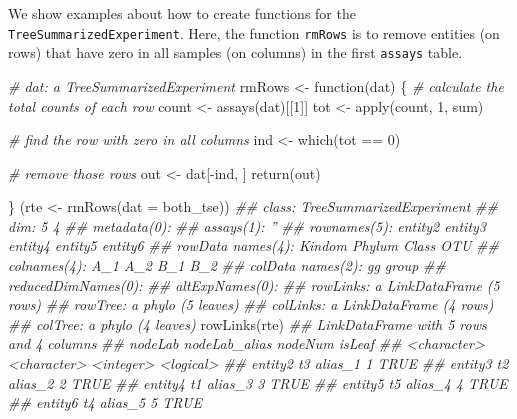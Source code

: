 \documentclass[]{article}
\newcommand{\hlnum}[1]{\textcolor[rgb]{0.816,0.125,0.439}{#1}}%
\newcommand{\hlstr}[1]{\textcolor[rgb]{0.251,0.627,0.251}{#1}}%
\newcommand{\hlcom}[1]{\textcolor[rgb]{0.502,0.502,0.502}{\textit{#1}}}%
\newcommand{\hlopt}[1]{\textcolor[rgb]{0,0,0}{#1}}%
\newcommand{\hlstd}[1]{\textcolor[rgb]{0.251,0.251,0.251}{#1}}%
\newcommand{\hlkwc}[1]{\textcolor[rgb]{0.251,0.251,0.251}{#1}}%
\newcommand{\hlkwd}[1]{\textcolor[rgb]{0.878,0.439,0.125}{#1}}%
\newenvironment{Shaded}{\begin{myshaded}}{\end{myshaded}}
\newcommand{\KeywordTok}[1]{\hlkwd{#1}}
\newcommand{\DataTypeTok}[1]{\hlkwc{#1}}
\newcommand{\DecValTok}[1]{\hlnum{#1}}
\newcommand{\StringTok}[1]{\hlstr{#1}}
\newcommand{\CommentTok}[1]{\hlcom{#1}}
\newcommand{\ControlFlowTok}[1]{\hlkwd{#1}}
\newcommand{\OperatorTok}[1]{\hlopt{#1}}
\newcommand{\NormalTok}[1]{\hlstd{#1}}
\begin{document}
We show examples about how to create functions for the
\texttt{TreeSummarizedExperiment}. Here, the function \texttt{rmRows} is to remove
entities (on rows) that have zero in all samples (on columns) in the first
\texttt{assays} table.

\begin{Shaded}
\begin{Highlighting}[]
\CommentTok{# dat: a TreeSummarizedExperiment}
\NormalTok{rmRows <-}\StringTok{ }\ControlFlowTok{function}\NormalTok{(dat) \{}
    \CommentTok{# calculate the total counts of each row}
\NormalTok{    count <-}\StringTok{ }\KeywordTok{assays}\NormalTok{(dat)[[}\DecValTok{1}\NormalTok{]]}
\NormalTok{    tot <-}\StringTok{ }\KeywordTok{apply}\NormalTok{(count, }\DecValTok{1}\NormalTok{, sum)}
    
    \CommentTok{# find the row with zero in all columns}
\NormalTok{    ind <-}\StringTok{ }\KeywordTok{which}\NormalTok{(tot }\OperatorTok{==}\StringTok{ }\DecValTok{0}\NormalTok{)}
    
    \CommentTok{# remove those rows}
\NormalTok{    out <-}\StringTok{ }\NormalTok{dat[}\OperatorTok{-}\NormalTok{ind, ]}
    \KeywordTok{return}\NormalTok{(out)}
    
\NormalTok{\}}
\NormalTok{(rte <-}\StringTok{ }\KeywordTok{rmRows}\NormalTok{(}\DataTypeTok{dat =}\NormalTok{ both_tse))}
\CommentTok{## class: TreeSummarizedExperiment }
\CommentTok{## dim: 5 4 }
\CommentTok{## metadata(0):}
\CommentTok{## assays(1): ''}
\CommentTok{## rownames(5): entity2 entity3 entity4 entity5 entity6}
\CommentTok{## rowData names(4): Kindom Phylum Class OTU}
\CommentTok{## colnames(4): A_1 A_2 B_1 B_2}
\CommentTok{## colData names(2): gg group}
\CommentTok{## reducedDimNames(0):}
\CommentTok{## altExpNames(0):}
\CommentTok{## rowLinks: a LinkDataFrame (5 rows)}
\CommentTok{## rowTree: a phylo (5 leaves)}
\CommentTok{## colLinks: a LinkDataFrame (4 rows)}
\CommentTok{## colTree: a phylo (4 leaves)}
\KeywordTok{rowLinks}\NormalTok{(rte)}
\CommentTok{## LinkDataFrame with 5 rows and 4 columns}
\CommentTok{##             nodeLab nodeLab_alias   nodeNum    isLeaf}
\CommentTok{##         <character>   <character> <integer> <logical>}
\CommentTok{## entity2          t3       alias_1         1      TRUE}
\CommentTok{## entity3          t2       alias_2         2      TRUE}
\CommentTok{## entity4          t1       alias_3         3      TRUE}
\CommentTok{## entity5          t5       alias_4         4      TRUE}
\CommentTok{## entity6          t4       alias_5         5      TRUE}
\end{Highlighting}
\end{Shaded}
\end{document}
